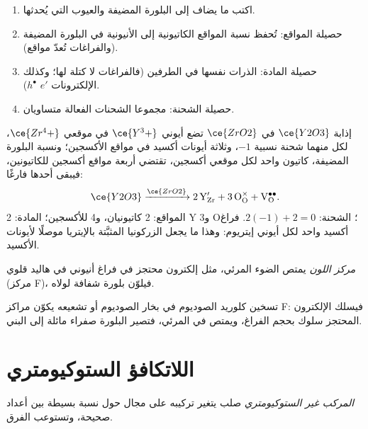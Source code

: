 \begin{method}\label{met:b3:solid-state:kroger-vink}
\begin{enumerate}
  \item اكتب ما يضاف إلى البلورة المضيفة والعيوب التي يُحدثها.
  \item حصيلة المواقع: تُحفظ نسبة المواقع الكاتيونية إلى الأنيونية في البلورة المضيفة
        (والفراغات تُعدّ مواقع).
  \item حصيلة المادة: الذرات نفسها في الطرفين (فالفراغات لا كتلة لها؛
        وكذلك الإلكترونات $e'$  $h^\bullet$).
  \item حصيلة الشحنة: مجموعا الشحنات الفعالة متساويان.
\end{enumerate}
\end{method}

\begin{example}
إذابة $\ce{Y2O3}$ في $\ce{ZrO2}$ تضع أيوني $\ce{Y^3+}$ في موقعي $\ce{Zr^4+}$، لكل منهما شحنة نسبية $-1$، 
وثلاثة أيونات أكسيد في مواقع الأكسجين؛ ونسبة البلورة المضيفة، كاتيون واحد لكل موقعي
أكسجين، تقتضي أربعة مواقع أكسجين للكاتيونين، فيبقى أحدها فارغًا:
\[
  \ce{Y2O3} \xrightarrow{\ce{ZrO2}} \mathrm{2\,Y_{Zr}' + 3\,O_O^{\times} + V_O^{\bullet\bullet}}.
\]
المواقع: 2 كاتيونيان، و4 للأكسجين؛ المادة: 2 Y و3 O؛ الشحنة: $2(-1) + 2 = 0$. فراغ أكسيد
واحد لكل أيوني إيتريوم: وهذا ما يجعل الزركونيا المثبَّتة بالإيتريا
موصلًا لأيونات الأكسيد.
\end{example}

\begin{definition}\label{def:b3:solid-state:colour-centre}
\emph{مركز اللون}  يمتص
الضوء المرئي، مثل إلكترون محتجز في فراغ أنيوني في هاليد
قلوي (مركز F)، فيلوّن بلورة شفافة لولاه.
\end{definition}

تسخين كلوريد الصوديوم في بخار الصوديوم أو تشعيعه يكوّن مراكز F: فيسلك
الإلكترون المحتجز سلوك  بحجم الفراغ، 
ويمتص في المرئي، فتصير البلورة صفراء مائلة إلى البني.

\section{اللاتكافؤ الستوكيومتري}

\begin{definition}\label{def:b3:solid-state:non-stoichiometric}
\emph{المركب غير الستوكيومتري}
صلب يتغير تركيبه على مجال حول نسبة بسيطة بين أعداد
صحيحة، وتستوعب  الفرق.
\end{definition}

